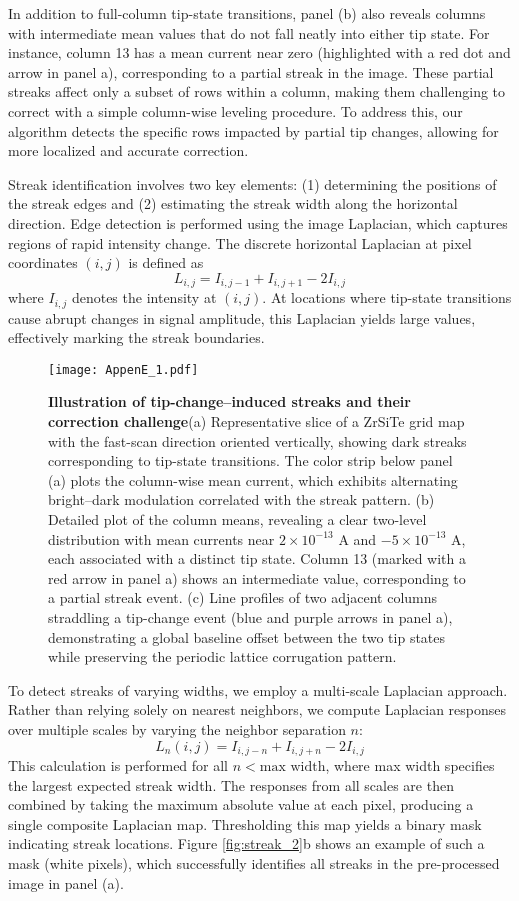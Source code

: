 In addition to full-column tip-state transitions, panel (b) also reveals columns with intermediate mean values that do not fall neatly into either tip state. For instance, column 13 has a mean current near zero (highlighted with a red dot and arrow in panel a), corresponding to a partial streak in the image. These partial streaks affect only a subset of rows within a column, making them challenging to correct with a simple column-wise leveling procedure. To address this, our algorithm detects the specific rows impacted by partial tip changes, allowing for more localized and accurate correction.

Streak identification involves two key elements: (1) determining the positions of the streak edges and (2) estimating the streak width along the horizontal direction. Edge detection is performed using the image Laplacian, which captures regions of rapid intensity change. The discrete horizontal Laplacian at pixel coordinates $(i,j)$ is defined as
$$L_{i,j} = I_{i,j-1} + I_{i,j+1} - 2I_{i,j}$$
where $I_{i,j}$ denotes the intensity at $(i,j)$. At locations where tip-state transitions cause abrupt changes in signal amplitude, this Laplacian yields large values, effectively marking the streak boundaries.

\begin{figure}
	\texttt{[image: AppenE\_1.pdf]}
	\centering
	\caption[\textbf{Illustration of tip-change–induced streaks and their correction challenge}]{\textbf{Illustration of tip-change–induced streaks and their correction challenge}(a) Representative slice of a ZrSiTe grid map with the fast-scan direction oriented vertically, showing dark streaks corresponding to tip-state transitions. The color strip below panel (a) plots the column-wise mean current, which exhibits alternating bright–dark modulation correlated with the streak pattern. (b) Detailed plot of the column means, revealing a clear two-level distribution with mean currents near $2\times10^{-13}$ A and $-5\times10^{-13}$ A, each associated with a distinct tip state. Column 13 (marked with a red arrow in panel a) shows an intermediate value, corresponding to a partial streak event. (c) Line profiles of two adjacent columns straddling a tip-change event (blue and purple arrows in panel a), demonstrating a global baseline offset between the two tip states while preserving the periodic lattice corrugation pattern.}
	\label{fig:streak_1}
\end{figure}

To detect streaks of varying widths, we employ a multi-scale Laplacian approach. Rather than relying solely on nearest neighbors, we compute Laplacian responses over multiple scales by varying the neighbor separation $n$:
$$L_n(i,j) = I_{i,j-n} + I_{i,j+n} - 2I_{i,j}$$
This calculation is performed for all $n < \text{max width}$, where max width specifies the largest expected streak width. The responses from all scales are then combined by taking the maximum absolute value at each pixel, producing a single composite Laplacian map. Thresholding this map yields a binary mask indicating streak locations. Figure \ref{fig:streak_2}b shows an example of such a mask (white pixels), which successfully identifies all streaks in the pre-processed image in panel (a).

